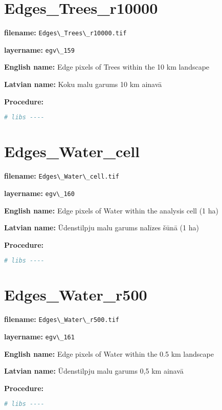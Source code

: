 \documentclass[
]{book}
\newcommand{\passthrough}[1]{#1}
\begin{document}
\section{Edges\_Trees\_r10000}\label{ch06.159}

\textbf{filename:} \passthrough{\lstinline!Edges\_Trees\_r10000.tif!}

\textbf{layername:} \passthrough{\lstinline!egv\_159!}

\textbf{English name:} Edge pixels of Trees within the 10 km landscape

\textbf{Latvian name:} Koku malu garums 10 km ainavā

\textbf{Procedure:}

\begin{lstlisting}[language=R]
# libs ----
\end{lstlisting}

\section{Edges\_Water\_cell}\label{ch06.160}

\textbf{filename:} \passthrough{\lstinline!Edges\_Water\_cell.tif!}

\textbf{layername:} \passthrough{\lstinline!egv\_160!}

\textbf{English name:} Edge pixels of Water within the analysis cell (1 ha)

\textbf{Latvian name:} Ūdenstilpju malu garums nalīzes šūnā (1 ha)

\textbf{Procedure:}

\begin{lstlisting}[language=R]
# libs ----
\end{lstlisting}

\section{Edges\_Water\_r500}\label{ch06.161}

\textbf{filename:} \passthrough{\lstinline!Edges\_Water\_r500.tif!}

\textbf{layername:} \passthrough{\lstinline!egv\_161!}

\textbf{English name:} Edge pixels of Water within the 0.5 km landscape

\textbf{Latvian name:} Ūdenstilpju malu garums 0,5 km ainavā

\textbf{Procedure:}

\begin{lstlisting}[language=R]
# libs ----
\end{lstlisting}
\end{document}
